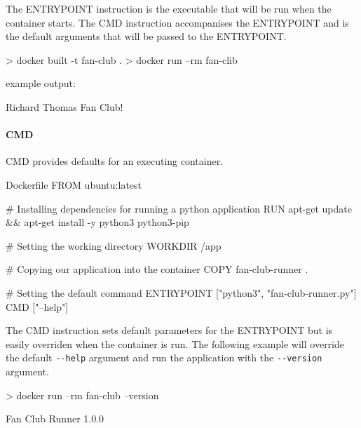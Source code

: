 \documentclass{csse4400}
\begin{document}
The ENTRYPOINT instruction is the executable that will be run when the container starts.
The CMD instruction accompanises the ENTRYPOINT and is the default arguments that will be passed to the ENTRYPOINT.

\begin{code}[language=shell,numbers=none]{}
> docker built -t fan-club .
> docker run --rm fan-clib
\end{code}

example output:

\begin{code}[language=shell,numbers=none]{}
Richard Thomas Fan Club!
\end{code}

\paragraph{CMD}
CMD provides defaults for an executing container.

\begin{code}[language=docker,numbers=none]{Dockerfile}
FROM ubuntu:latest

# Installing dependencies for running a python application
RUN apt-get update && apt-get install -y python3 python3-pip

# Setting the working directory
WORKDIR /app

# Copying our application into the container
COPY fan-club-runner .

# Setting the default command
ENTRYPOINT ["python3", "fan-club-runner.py"]
CMD ["--help"]
\end{code}

The CMD instruction sets default parameters for the ENTRYPOINT but is easily overriden when the container is run.
The following example will override the default \texttt{-{}-help} argument and run the application with the \texttt{-{}-version} argument.

\begin{code}[language=shell,numbers=none]{}
> docker run --rm fan-club --version
\end{code}

\begin{code}[language=shell,numbers=none]{}
  Fan Club Runner 1.0.0
\end{code}

\end{document}
